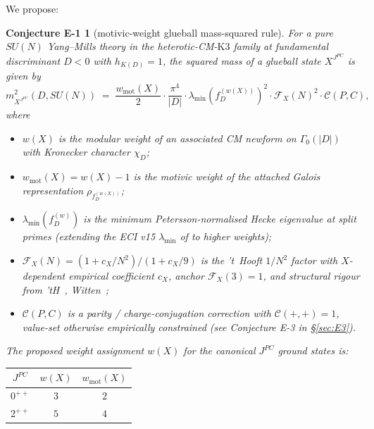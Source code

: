 \documentclass[11pt,a4paper]{amsart}
\newtheorem*{conjecture-E1}{Conjecture E-1}
\theoremstyle{definition}
\begin{document}
We propose:
\begin{conjecture-E1}[motivic-weight glueball mass-squared rule]
\label{conj:E1}
For a pure $SU(N)$ Yang--Mills theory in the heterotic-CM-$\mathrm{K3}$ family at
fundamental discriminant $D < 0$ with $h_{K(D)} = 1$, the squared mass of a
glueball state $X^{J^{PC}}$ is given by
\begin{equation}\label{eq:E1}
m_{X^{J^{PC}}}^{2}(D, SU(N)) \;=\; \frac{w_{\mathrm{mot}}(X)}{2} \cdot
\frac{\pi^{4}}{|D|} \cdot \lambda_{\min}(f_{D}^{(w(X))})^{2} \cdot \mathcal{F}_{X}(N)^{2}
\cdot \mathcal{C}(P, C),
\end{equation}
where
\begin{itemize}\setlength\itemsep{2pt}
\item $w(X)$ is the modular weight of an associated CM newform on $\Gamma_{0}(|D|)$
      with Kronecker character $\chi_{D}$;
\item $w_{\mathrm{mot}}(X) = w(X) - 1$ is the motivic weight of the attached Galois
      representation $\rho_{f_{D}^{(w(X))}}$;
\item $\lambda_{\min}(f_{D}^{(w)})$ is the minimum Petersson-normalised Hecke
      eigenvalue at split primes (extending the ECI v15 $\lambda_{\min}$ of
      \cite[\S2.2]{ThmC6FN} to higher weights);
\item $\mathcal{F}_{X}(N) = (1 + c_{X}/N^{2})/(1 + c_{X}/9)$ is the 't~Hooft
      $1/N^{2}$ factor with $X$-dependent empirical coefficient $c_{X}$, anchor
      $\mathcal{F}_{X}(3) = 1$, and structural rigour from
      'tH~\cite{tHooft1974}, Witten~\cite{Witten1979};
\item $\mathcal{C}(P, C)$ is a parity / charge-conjugation correction with
      $\mathcal{C}(+, +) = 1$, value-set otherwise empirically constrained (see
      Conjecture E-3 in \S\ref{sec:E3}).
\end{itemize}
The proposed weight assignment $w(X)$ for the canonical $J^{PC}$ ground states is:
\begin{center}
\begin{tabular}{ccc}
\toprule
$J^{PC}$ & $w(X)$ & $w_{\mathrm{mot}}(X)$ \\
\midrule
$0^{++}$ & $3$ & $2$ \\
$2^{++}$ & $5$ & $4$ \\
\bottomrule
\end{tabular}
\end{center}
\end{conjecture-E1}
\end{document}
